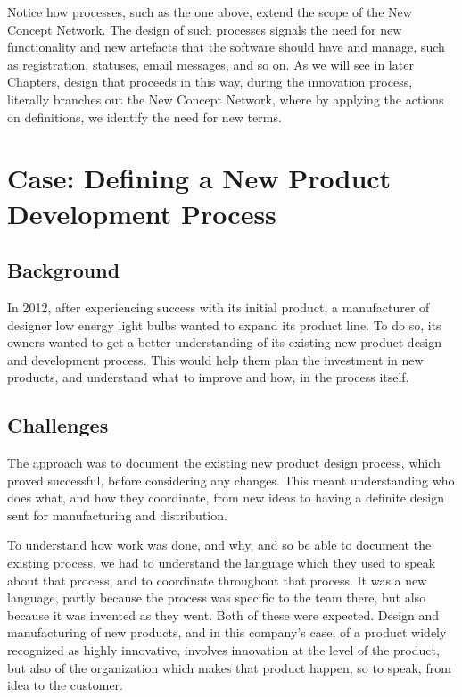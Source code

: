 \documentclass[graybox,envcountchap,sectrefs]{svmono}
\newcommand{\ncnf}{New Concept Network}
\begin{document}
Notice how processes, such as the one above, extend the scope of the \ncnf. The design of such processes signals the need for new functionality and new artefacts that the software should have and manage, such as registration, statuses, email messages, and so on. As we will see in later Chapters, design that proceeds in this way, during the innovation process, literally branches out the \ncnf, where by applying the actions on definitions, we identify the need for new terms.

\printbibliography


\chapter{Case: Defining a New Product Development Process}\label{c:case:defining-new-product-development-process}

\section{Background}
In 2012, after experiencing success with its initial product, a manufacturer of designer low energy light bulbs wanted to expand its product line. To do so, its owners wanted to get a better understanding of its existing new product design and development process. This would help them plan the investment in new products, and understand what to improve and how, in the process itself.

\section{Challenges}
The approach was to document the existing new product design process, which proved successful, before considering any changes. This meant understanding who does what, and how they coordinate, from new ideas to having a definite design sent for manufacturing and distribution. 

To understand how work was done, and why, and so be able to document the existing process, we had to understand the language which they used to speak about that process, and to coordinate throughout that process. It was a new language, partly because the process was specific to the team there, but also because it was invented as they went. Both of these were expected. Design and manufacturing of new products, and in this company's case, of a product widely recognized as highly innovative, involves innovation at the level of the product, but also of the organization which makes that product happen, so to speak, from idea to the customer. 
\end{document}
